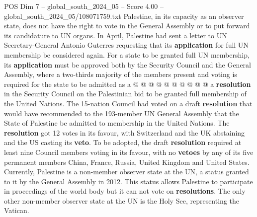 \begin{textsample}{POS Dim 7 – global\_south\_2024\_05 – Score 4.00 – global\_south\_2024\_05/108071759.txt}
Palestine, in its capacity as an observer state, does not have the right to vote in the General Assembly or to put forward its candidature to UN organs.
In April, Palestine had sent a letter to UN Secretary-General Antonio Guterres requesting that its \textbf{application} for full UN membership be considered again.
For a state to be granted full UN membership, its \textbf{application} must be approved both by the Security Council and the General Assembly, where a two-thirds majority of the members present and voting is required for the state to be admitted as a @ @ @ @ @ @ @ @ @ @ a \textbf{resolution} in the Security Council on the Palestinian bid to be granted full membership of the United Nations.
The 15-nation Council had voted on a draft \textbf{resolution} that would have recommended to the 193-member UN General Assembly that the State of Palestine be admitted to membership in the United Nations.
The \textbf{resolution} got 12 votes in its favour, with Switzerland and the UK abstaining and the US casting its \textbf{veto}.
To be adopted, the draft \textbf{resolution} required at least nine Council members voting in its favour, with no \textbf{vetoes} by any of its five permanent members China, France, Russia, United Kingdom and United States.
Currently, Palestine is a non-member observer state at the UN, a status granted to it by the General Assembly in 2012.
This status allows Palestine to participate in proceedings of the world body but it can not vote on \textbf{resolutions}.
The only other non-member observer state at the UN is the Holy See, representing the Vatican.

\end{textsample}
